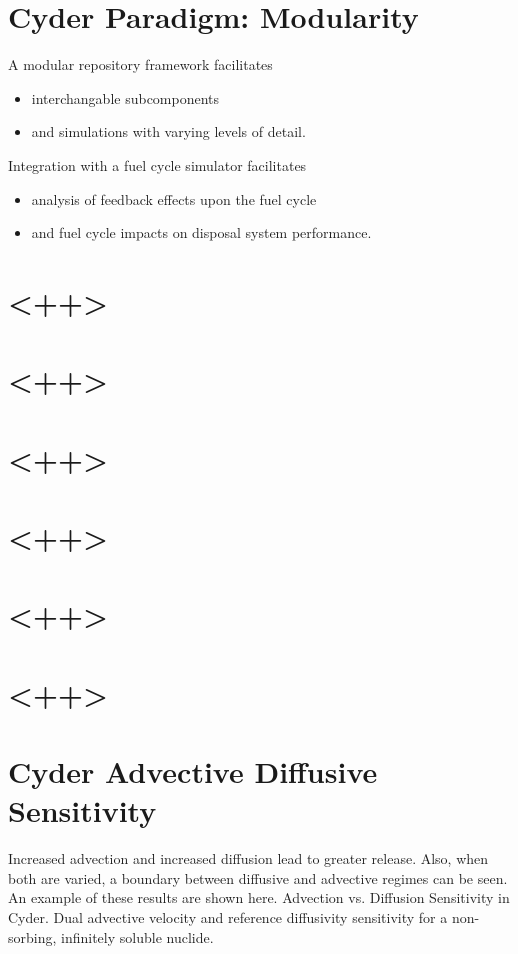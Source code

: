 \documentclass[letterpaper]{article}
\begin{document}
\section*{Cyder Paradigm: Modularity}
A modular repository framework facilitates
\begin{itemize}
\item interchangable subcomponents
\item and simulations with varying levels of detail.
\end{itemize}
Integration with a fuel cycle simulator facilitates
\begin{itemize}
\item analysis of feedback effects upon the fuel cycle
\item and fuel cycle impacts on disposal system performance.
\end{itemize}

\section*{<++>}
\section*{<++>}
\section*{<++>}
\section*{<++>}
\section*{<++>}
\section*{<++>}


\pagebreak








\section*{Cyder Advective Diffusive Sensitivity}
Increased advection and increased diffusion lead to greater release. Also, when 
both are varied, a boundary between diffusive and advective
regimes can be seen. An example of these results are shown here.
Advection vs. Diffusion Sensitivity in Cyder. Dual advective velocity 
and reference diffusivity sensitivity for a non-sorbing, infinitely soluble 
nuclide.
\end{document}
